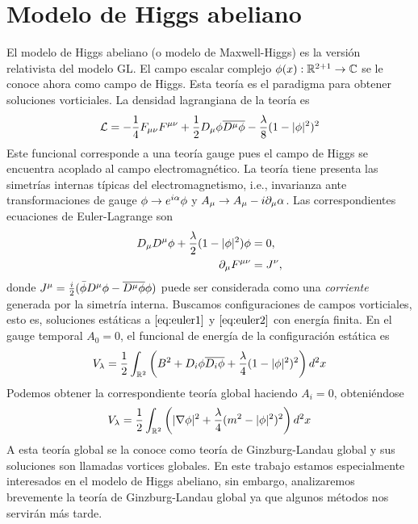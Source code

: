 \section{Modelo de Higgs abeliano}

El modelo de Higgs abeliano (o modelo de Maxwell-Higgs) es la versión relativista del modelo GL. El campo escalar complejo $\phi(x):\mathbb{R}^{2+1}\rightarrow\mathbb{C}$ se le conoce ahora como campo de Higgs. Esta teoría es el paradigma para obtener soluciones vorticiales. La densidad lagrangiana de la teoría es
\begin{align}
    \mathcal{L} = -\frac{1}{4} F_{\mu\nu}F^{\mu\nu}+\frac{1}{2}D_\mu\phi\overline{D^\mu\phi}-\frac{\lambda}{8}(1-|\phi|^2)^2 \label{eq:2}
\end{align}
Este funcional corresponde a una teoría gauge pues el campo de Higgs se encuentra acoplado al campo electromagnético. La teoría tiene presenta las simetrías internas típicas del electromagnetismo, i.e., invarianza ante transformaciones de gauge $\phi\rightarrow e^{i\alpha}\phi$ y $A_\mu\rightarrow A_\mu-i\partial_\mu\alpha$. Las correspondientes ecuaciones de Euler-Lagrange son
\begin{align}
    D_\mu D^\mu\phi + \frac{\lambda}{2}(1-|\phi|^2)\phi &=0,\label{eq:euler1}\\
    \partial_\mu F^{\mu\nu} &= J^\nu,\label{eq:euler2}
\end{align}
donde $J^\mu=\frac{i}{2}(\bar\phi D^\mu\phi-\overline{D^\mu\phi}\phi)$ puede ser considerada como una \emph{corriente} generada por la simetría interna. Buscamos configuraciones de campos vorticiales, esto es, soluciones estáticas a $\eqref{eq:euler1}$ y $\eqref{eq:euler2}$ con energía finita. En el gauge temporal $A_0=0$, el funcional de energía de la configuración estática es
\begin{align}
    V_{\lambda} = \frac{1}{2}\int_{\mathbb{R}^2}\left(B^2+D_i\phi\overline{D_i\phi}+\frac{\lambda}{4}(1-|\phi|^2)^2\right)d^2x \label{eq:gl}
\end{align}
Podemos obtener la correspondiente teoría global haciendo $A_i=0$, obteniéndose
\begin{align}
    V_{\lambda} = \frac{1}{2}\int_{\mathbb{R}^2}\left(|\nabla\phi|^2+\frac{\lambda}{4}(m^2-|\phi|^2)^2\right)d^2x \label{eq:3a}
\end{align}
A esta teoría global se la conoce como teoría de Ginzburg-Landau global y sus soluciones son llamadas vortices globales. En este trabajo estamos especialmente interesados en el modelo de Higgs abeliano, sin embargo, analizaremos brevemente la teoría de Ginzburg-Landau global ya que algunos métodos nos servirán más tarde.

